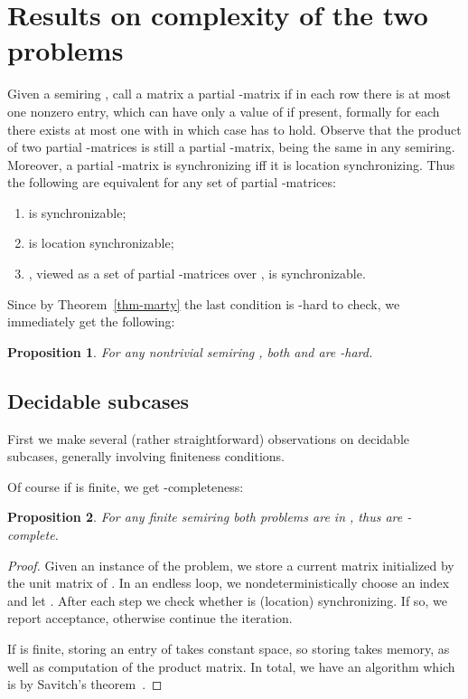 \documentclass[submission,copyright,creativecommons]{eptcs}
\theoremstyle{plain}
\newtheorem{proposition}{Proposition}
\theoremstyle{definition}
\theoremstyle{remark}
\begin{document}
\section{Results on complexity of the two problems}

Given a semiring , call a matrix  a partial -matrix if in each row there is at most one nonzero entry,
which can have only a value of  if present, formally for each  there exists at most one  with  in which
case  has to hold. Observe that the product of two partial -matrices is still a partial -matrix, being the
same in any semiring. Moreover, a partial -matrix is synchronizing iff it is location synchronizing.
Thus the following are equivalent for any set  of partial -matrices:
\begin{enumerate}
\item  is synchronizable;
\item  is location synchronizable;
\item , viewed as a set of partial -matrices over , is synchronizable.
\end{enumerate}
Since by Theorem~\ref{thm-marty} the last condition is -hard to check, we immediately get the following:
\begin{proposition}
For any nontrivial semiring , both  and  are -hard.
\end{proposition}

\subsection{Decidable subcases}

First we make several (rather straightforward) observations on decidable subcases, generally involving finiteness conditions.

Of course if  is finite, we get -completeness: 
\begin{proposition}
For any finite semiring  both problems are in , thus are -complete.
\end{proposition}
\begin{proof}
Given an instance  of the problem,
we store a current matrix  initialized by the unit matrix  of .
In an endless loop, we nondeterministically choose an index  and let .
After each step we check whether  is (location) synchronizing. If so, we report acceptance, otherwise
continue the iteration.

If  is finite, storing an entry of  takes constant space, so storing  takes  memory,
as well as computation of the product matrix. In total, we have an  algorithm which
is  by Savitch's theorem~\cite{papadimitriou}.
\end{proof}
\end{document}
